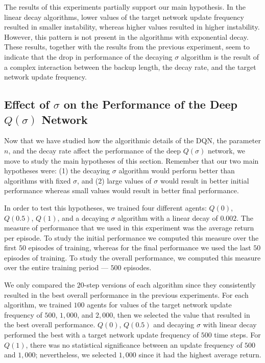 The results of this experiments partially support our main hypothesis.
In the linear decay algorithms, lower values of the target network update frequency resulted in smaller instability, whereas higher values resulted in higher instability.
However, this pattern is not present in the algorithms with exponential decay. 
These results, together with the results from the previous experiment, seem to indicate that the drop in performance of the decaying $\sigma$ algorithm is the result of a complex interaction between the backup length, the decay rate, and the target network update frequency.

\subsection{Effect of $\sigma$ on the Performance of the Deep $Q(\sigma)$ Network}
\label{subse:ch5_best_nstep}

Now that we have studied how the algorithmic details of the DQN, the parameter $n$, and the decay rate affect the performance of the deep $Q(\sigma)$ network, we move to study the main hypotheses of this section.
Remember that our two main hypotheses were: (1) the decaying $\sigma$ algorithm would perform better than algorithms with fixed $\sigma$, and (2) large values of $\sigma$ would result in better initial performance whereas small values would result in better final performance.

In order to test this hypotheses, we trained four different agents: $Q(0)$, $Q(0.5)$, $Q(1)$, and a decaying $\sigma$ algorithm with a linear decay of $0.002$.
The measure of performance that we used in this experiment was the average return per episode.
To study the initial performance we computed this measure over the first $50$ episodes of training, whereas for the final performance we used the last $50$ episodes of training.
To study the overall performance, we computed this measure over the entire training period --- $500$ episodes.

We only compared the $20$-step versions of each algorithm since they consistently resulted in the best overall performance in the previous experiments.
For each algorithm, we trained $100$ agents for values of the target network update frequency of $500$, $1,000$, and $2,000$, then we selected the value that resulted in the best overall performance.
$Q(0)$, $Q(0.5)$ and decaying $\sigma$ with linear decay performed the best with a target network update frequency of $500$ time steps.
For $Q(1)$, there was no statistical significance between an update frequency of $500$ and $1,000$; nevertheless, we selected $1,000$ since it had the highest average return.

